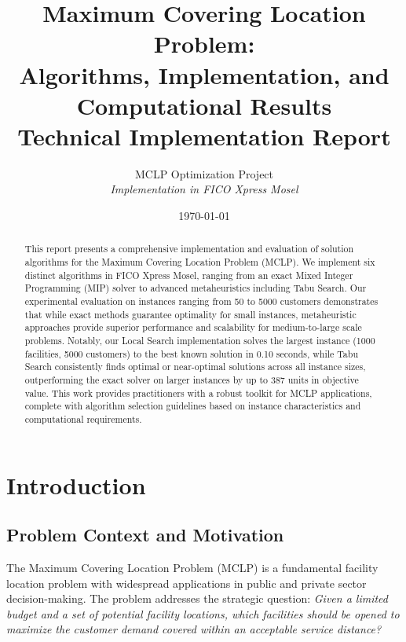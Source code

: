 \documentclass[11pt,a4paper]{article}
\title{
  \textbf{Maximum Covering Location Problem:}\\
  \textbf{Algorithms, Implementation, and Computational Results}\\
  \vspace{0.5cm}
  \large Technical Implementation Report
}
\author{
  MCLP Optimization Project\\
  \textit{Implementation in FICO Xpress Mosel}
}
\date{\today}
\begin{document}
\maketitle

\begin{abstract}
This report presents a comprehensive implementation and evaluation of solution algorithms for the Maximum Covering Location Problem (MCLP). We implement six distinct algorithms in FICO Xpress Mosel, ranging from an exact Mixed Integer Programming (MIP) solver to advanced metaheuristics including Tabu Search. Our experimental evaluation on instances ranging from 50 to 5000 customers demonstrates that while exact methods guarantee optimality for small instances, metaheuristic approaches provide superior performance and scalability for medium-to-large scale problems. Notably, our Local Search implementation solves the largest instance (1000 facilities, 5000 customers) to the best known solution in 0.10 seconds, while Tabu Search consistently finds optimal or near-optimal solutions across all instance sizes, outperforming the exact solver on larger instances by up to 387 units in objective value. This work provides practitioners with a robust toolkit for MCLP applications, complete with algorithm selection guidelines based on instance characteristics and computational requirements.
\end{abstract}

\tableofcontents
\newpage

\section{Introduction}

\subsection{Problem Context and Motivation}

The Maximum Covering Location Problem (MCLP) is a fundamental facility location problem with widespread applications in public and private sector decision-making. The problem addresses the strategic question: \textit{Given a limited budget and a set of potential facility locations, which facilities should be opened to maximize the customer demand covered within an acceptable service distance?}
\end{document}
